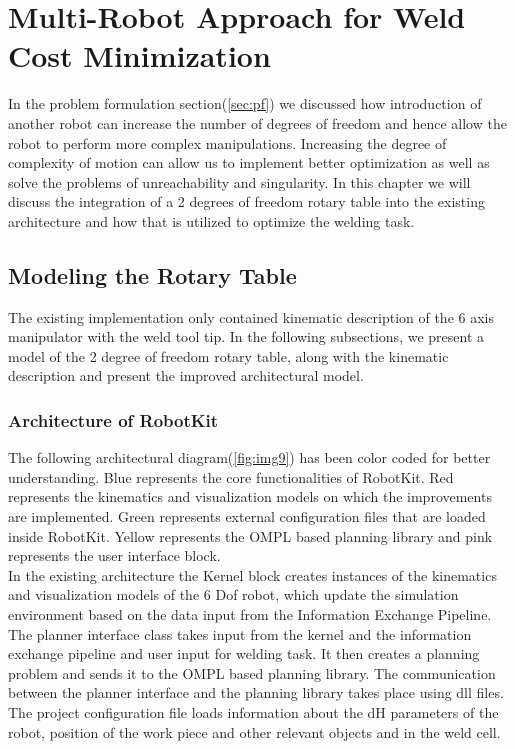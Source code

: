 \section{Multi-Robot Approach for Weld Cost Minimization}
\localtableofcontents
In the problem formulation section(\ref{sec:pf}) we discussed how introduction of another robot can increase the number of degrees of freedom and hence allow the robot to perform more complex manipulations. Increasing the degree of complexity of motion can allow us to implement better optimization as well as solve the problems of unreachability and singularity. In this chapter we will discuss the integration of a 2 degrees of freedom rotary table into the existing architecture and how that is utilized to optimize the welding task. 

\subsection{Modeling the Rotary Table}
The existing implementation only contained kinematic description of the 6 axis manipulator with the weld tool tip. In the following subsections, we present a model of the 2 degree of freedom rotary table, along with the kinematic description and present the improved architectural model.
\subsubsection{Architecture of RobotKit}
The following architectural diagram(\ref{fig:img9}) has been color coded for better understanding. Blue represents the core functionalities of RobotKit. Red represents the kinematics and visualization models on which the improvements are implemented. Green represents external configuration files that are loaded inside RobotKit. Yellow represents the OMPL based planning library and pink represents the user interface block. \\
In the existing architecture the Kernel block creates instances of the kinematics and visualization models of the 6 Dof robot, which update the simulation environment based on the data input from the Information Exchange Pipeline. The planner interface class takes input from the kernel and the information exchange pipeline and user input for welding task. It then creates a planning problem and sends it to the OMPL based planning library. The communication between the planner interface and the planning library takes place using dll files. The project configuration file loads information about the dH parameters of the robot, position of the work piece and other relevant objects and in the weld cell. 

